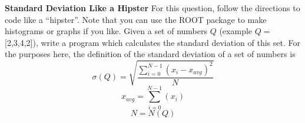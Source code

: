 \documentclass[12pt]{article}
\begin{document}
\newpage
\textbf{Standard Deviation Like a Hipster}
\newline
For this question, follow the directions to code like a ``hipster''.  Note that you can use the ROOT package to make histograms or graphs if you like.
\newline
\newline
Given a set of numbers $Q$ (example $Q=$[2,3,4,2]), write a program which calculates the standard deviation of this set.  For the purposes here, the definition of the standard deviation of a set of numbers is
\begin{displaymath}
\sigma(Q)=\sqrt{\frac{\displaystyle\sum_{i=0}^{N-1} (x_{i}-x_{avg})^2}{N}} 
\end{displaymath}
\begin{displaymath}
x_{avg}=\displaystyle\sum_{i=0}^{N-1} (x_{i})
\end{displaymath}
\begin{displaymath}
N=N(Q)
\end{displaymath}
\newline
\end{document}
